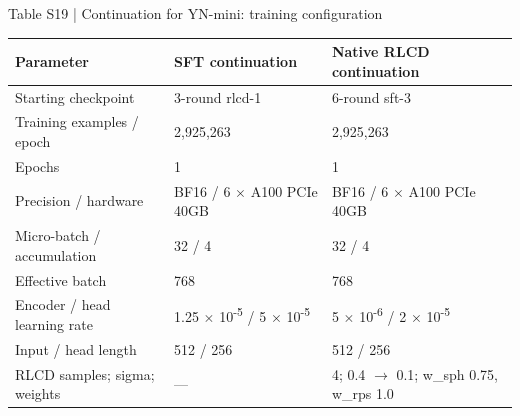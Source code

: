 \documentclass[10pt]{article}
\begin{document}
\begin{center}
\begin{minipage}{\textwidth}
\fontsize{8.5}{10.3}\selectfont
Table S19 | Continuation for YN-mini: training configuration
\par\vspace{4pt}
\begin{tabularx}{\textwidth}{@{}XXX@{}}
\toprule
Parameter & SFT continuation & Native RLCD continuation \\
\midrule
Starting checkpoint & 3-round rlcd-1 & 6-round sft-3 \\
Training examples / epoch & 2,925,263 & 2,925,263 \\
Epochs & 1 & 1 \\
Precision / hardware & BF16 / 6 \ensuremath{\times} A100 PCIe 40GB & BF16 / 6 \ensuremath{\times} A100 PCIe 40GB \\
Micro-batch / accumulation & 32 / 4 & 32 / 4 \\
Effective batch & 768 & 768 \\
Encoder / head learning rate & 1.25 \ensuremath{\times} 10\textsuperscript{-}\textsuperscript{5} / 5 \ensuremath{\times} 10\textsuperscript{-}\textsuperscript{5} & 5 \ensuremath{\times} 10\textsuperscript{-}\textsuperscript{6} / 2 \ensuremath{\times} 10\textsuperscript{-}\textsuperscript{5} \\
Input / head length & 512 / 256 & 512 / 256 \\
RLCD samples; sigma; weights & — & 4; 0.4 \ensuremath{\rightarrow} 0.1; w\_sph 0.75, w\_rps 1.0 \\
\bottomrule
\end{tabularx}
\par{}
\end{minipage}
\end{center}
\end{document}
